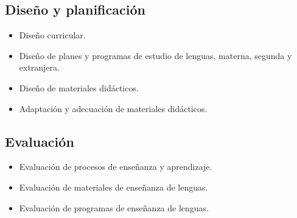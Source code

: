 \subsection{Dise\~{n}o y planificaci\'{o}n}

\begin{itemize}

\item Dise\~{n}o curricular.
\item Dise\~{n}o de planes y programas de estudio de lenguas, materna, segunda
y extranjera.
\item Dise\~{n}o de materiales did\'{a}cticos.
\item Adaptaci\'{o}n y adecuaci\'{o}n de materiales did\'{a}cticos.

\end{itemize}

\subsection{Evaluaci\'{o}n}

\begin{itemize}

\item Evaluaci\'{o}n de procesos de ense\~{n}anza y aprendizaje.
\item Evaluaci\'{o}n de materiales de ense\~{n}anza de lenguas.
\item Evaluaci\'{o}n de programas de ense\~{n}anza de lenguas.

\end{itemize}